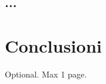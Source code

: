 \documentclass[12pt,a4paper,openright,twoside]{book}
\begin{document}
\section{...}

\chapter{Conclusioni}
\label{chap:conclusions}


\backmatter

\nocite{*} %




\begin{acknowledgements} %
Optional. Max 1 page.
\end{acknowledgements}
\end{document}

